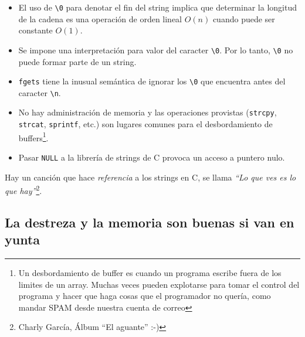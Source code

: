 \documentclass[12pt,a4paper,spanish]{article}
\begin{document}
\begin{itemize}

\item El uso de \verb+\0+ para denotar el fin del string implica que
determinar la longitud de la cadena es una operación de orden lineal
$O(n)$ cuando puede ser constante $O(1)$.

\item Se impone una interpretación para valor del caracter \verb+\0+.
Por lo tanto, \verb+\0+ no puede formar parte de un string.

\item \verb+fgets+ tiene la inusual semántica de ignorar los
\verb+\0+ que encuentra antes del caracter \verb+\n+.

\item No hay administración de memoria y las operaciones provistas
(\verb+strcpy+, \verb+strcat+, \verb+sprintf+, etc.) son lugares comunes
para el desbordamiento de buffers\footnote{Un desbordamiento de buffer es cuando
un programa escribe fuera de los limites de un array. Muchas veces pueden
explotarse para tomar el control del programa y hacer que haga cosas que el
programador no quería, como mandar SPAM desde nuestra cuenta de correo}.

\item Pasar \verb+NULL+ a la librería de strings de \textsf{C} provoca
un acceso a puntero nulo.

\end{itemize}

Hay un canción que hace \textit{referencia} a los strings en \textsf{C},
se llama \textit{``Lo que ves es lo que hay''}\footnote{Charly García,
Álbum ``El aguante'' :-)}.

\subsection*{La destreza y la memoria son buenas si van en yunta}
\end{document}
